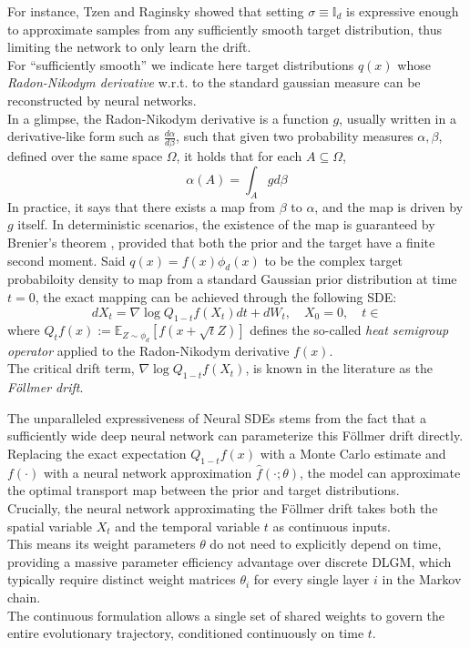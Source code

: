 \documentclass[11pt]{article}
\begin{document}
For instance, Tzen and Raginsky \cite{tzen2019neural} showed that setting $\sigma \equiv \mathbb{I}_d$ is expressive enough to approximate samples from any sufficiently smooth target distribution, thus limiting the network to only learn the drift. \\ 
For ``sufficiently smooth'' we indicate here target distributions $q(x)$ whose \textit{Radon-Nikodym derivative} w.r.t. to the standard gaussian measure can be reconstructed by neural networks. \\ 
In a glimpse, the Radon-Nikodym derivative is a function $g$, usually written in a derivative-like form such as $\frac{d\alpha}{d\beta}$, such that given two probability measures $\alpha, \beta$, defined over the same space $\Omega$, it holds that for each $A \subseteq \Omega$,
\begin{equation}
  \alpha(A) = \int_A g d\beta \label{eq:dglm-radon-theorem}
\end{equation} 
In practice, it says that there exists a map from $\beta$ to $\alpha$, and the map is driven by $g$ itself.
In deterministic scenarios, the existence of the map is guaranteed by Brenier's theorem \cite{brenier1991polar}, provided that both the prior and the target have a finite second moment.
Said $q(x) = f(x)\phi_d(x)$ to be the complex target probabiloity density to map from a standard Gaussian prior distribution at time $t=0$, the exact mapping can be achieved through the following SDE:
$$dX_t = \nabla \log Q_{1-t}f(X_t)dt + dW_t, \quad X_0 = 0, \quad t \in $$
where $Q_t f(x) := \mathbb{E}_{Z \sim \phi_d}[f(x + \sqrt{t}Z)]$ defines the so-called \textit{heat semigroup operator} applied to the Radon-Nikodym derivative $f(x)$. \\ 
The critical drift term, $\nabla \log Q_{1-t}f(X_t)$, is known in the literature as the \textit{Föllmer drift}. 

The unparalleled expressiveness of Neural SDEs stems from the fact that a sufficiently wide deep neural network can parameterize this Föllmer drift directly. \\ 
Replacing the exact expectation $Q_{1-t}f(x)$ with a Monte Carlo estimate and $f(\cdot)$ with a neural network approximation $\hat{f}(\cdot; \theta)$, the model can approximate the optimal transport map between the prior and target distributions. \\ 
Crucially, the neural network approximating the Föllmer drift takes both the spatial variable $X_t$ and the temporal variable $t$ as continuous inputs. \\ This means its weight parameters $\theta$ do not need to explicitly depend on time, providing a massive parameter efficiency advantage over discrete DLGM, which typically require distinct weight matrices $\theta_i$ for every single layer $i$ in the Markov chain. \\ 
The continuous formulation allows a single set of shared weights to govern the entire evolutionary trajectory, conditioned continuously on time $t$.
\end{document}
